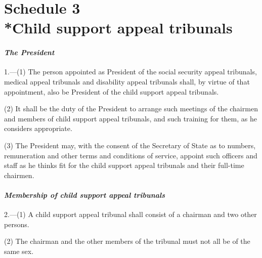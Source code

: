 \documentclass[12pt,a4paper]{article}
\begin{document}

\part[Schedule 3 --- Child support appeal tribunals]{Schedule 3\\*Child support appeal tribunals}

\renewcommand\parthead{--- Schedule 3}


\subsection*{\itshape The President}

1.---(1) The person appointed 
as President of the social security appeal tribunals, medical appeal tribunals and disability appeal tribunals shall, by virtue of that appointment, also be President of the child support appeal tribunals.

(2) It shall be the duty of the President to arrange such meetings of the chairmen and members of child support appeal tribunals, and such training for them, as he considers appropriate.

(3) The President may, with the consent of the Secretary of State as to numbers, remuneration and other terms and conditions of service, appoint such officers and staff as he thinks fit for the child support appeal tribunals and their full-time chairmen.


\subsection*{\itshape Membership of child support appeal tribunals}

2.---(1) A child support appeal tribunal shall consist of a chairman and two other persons.

(2) The chairman and the other members of the tribunal must not all be of the same sex.
\end{document}
